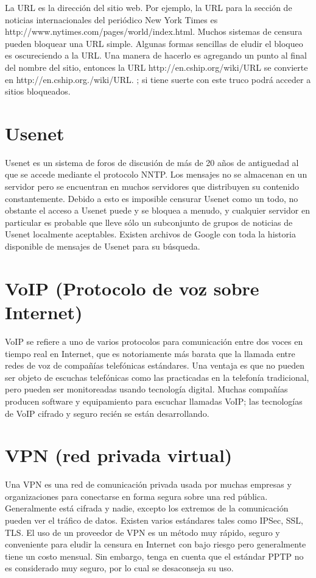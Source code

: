 \documentclass[10pt,a5paper,twoside,,]{book}
\begin{document}
La URL es la dirección del sitio web. Por ejemplo, la URL para la
sección de noticias internacionales del periódico New York Times es
http://www.nytimes.com/pages/world/index.html. Muchos sistemas de
censura pueden bloquear una URL simple. Algunas formas sencillas de
eludir el bloqueo es oscureciendo a la URL. Una manera de hacerlo es
agregando un punto al final del nombre del sitio, entonces la URL
http://en.cship.org/wiki/URL se convierte en
http://en.cship.org./wiki/URL. ; si tiene suerte con este truco podrá
acceder a sitios bloqueados.

\section{Usenet}\label{usenet}

Usenet es un sistema de foros de discusión de más de 20 años de
antiguedad al que se accede mediante el protocolo NNTP. Los mensajes no
se almacenan en un servidor pero se encuentran en muchos servidores que
distribuyen su contenido constantemente. Debido a esto es imposible
censurar Usenet como un todo, no obstante el acceso a Usenet puede y se
bloquea a menudo, y cualquier servidor en particular es probable que
lleve sólo un subconjunto de grupos de noticias de Usenet localmente
aceptables. Existen archivos de Google con toda la historia disponible
de mensajes de Usenet para su búsqueda.

\section{VoIP (Protocolo de voz sobre
Internet)}\label{voip-protocolo-de-voz-sobre-internet}

VoIP se refiere a uno de varios protocolos para comunicación entre dos
voces en tiempo real en Internet, que es notoriamente más barata que la
llamada entre redes de voz de compañías telefónicas estándares. Una
ventaja es que no pueden ser objeto de escuchas telefónicas como las
practicadas en la telefonía tradicional, pero pueden ser monitoreadas
usando tecnología digital. Muchas compañías producen software y
equipamiento para escuchar llamadas VoIP; las tecnologías de VoIP
cifrado y seguro recién se están desarrollando.

\section{VPN (red privada virtual)}\label{vpn-red-privada-virtual}

Una VPN es una red de comunicación privada usada por muchas empresas y
organizaciones para conectarse en forma segura sobre una red pública.
Generalmente está cifrada y nadie, excepto los extremos de la
comunicación pueden ver el tráfico de datos. Existen varios estándares
tales como IPSec, SSL, TLS. El uso de un proveedor de VPN es un método
muy rápido, seguro y conveniente para eludir la censura en Internet con
bajo riesgo pero generalmente tiene un costo mensual. Sin embargo, tenga
en cuenta que el estándar PPTP no es considerado muy seguro, por lo cual
se desaconseja su uso.
\end{document}
